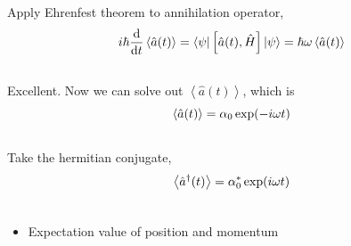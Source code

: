 \documentclass[letterpaper,10pt,english]{sphinxmanual}
\newcommand{\bra}[1]{\left\langle #1\right|}
\newcommand{\ket}[1]{\left| #1\right\rangle}
\newcommand{\avg}[1]{\left< #1 \right>}
\begin{document}
Apply Ehrenfest theorem to annihilation operator,
\begin{gather}
\begin{split}i\hbar \frac{\mathrm d}{\mathrm d t} \avg{\hat a(t)} = \bra{\psi} \left[ \hat a(t), \hat H \right] \ket{\psi} = \hbar \omega \avg{\hat a(t)}\end{split}\notag\\\begin{split}\end{split}\notag
\end{gather}
Excellent. Now we can solve out $\avg{\hat a(t)}$, which is
\begin{gather}
\begin{split}\avg{\hat a(t)} = \alpha_0 \exp(-i\omega t)\end{split}\notag\\\begin{split}\end{split}\notag
\end{gather}
Take the hermitian conjugate,
\begin{gather}
\begin{split}\avg{\hat a^\dagger (t)} = \alpha_0^* \exp(i\omega t)\end{split}\notag\\\begin{split}\end{split}\notag
\end{gather}\begin{itemize}
\item {} 
Expectation value of position and momentum

\end{itemize}
\end{document}
